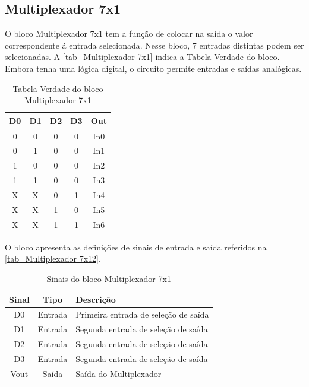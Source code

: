 \renewcommand{\NomeBloco}{Multiplexador 7x1}
\renewcommand{\NomePTab}{tab_\NomeBloco}
\renewcommand{\NomeSTab}{tab_\NomeBloco2}
\renewcommand{\NomePFig}{fig_\NomeBloco}
\renewcommand{\NomeSFig}{fig_\NomeBloco2}
\renewcommand{\NomeTTab}{tab_\NomeBloco3}

\subsection{\NomeBloco}

O bloco \NomeBloco{} tem a fun{\c c}\~ao de colocar na sa\'ida o valor correspondente \'a entrada selecionada. Nesse bloco, 7 entradas distintas podem ser selecionadas. A \autoref{\NomePTab} indica a Tabela Verdade do bloco. Embora tenha uma l\'ogica digital, o circuito permite entradas e sa\'idas anal\'ogicas.

\begin{table}[htbp]

\caption{Tabela Verdade do bloco \NomeBloco}%
\label{\NomePTab}
\centering
\begin{tabular}{ccccc}
    \toprule
    D0 & D1 & D2 & D3 & Out \\
    \midrule \midrule
    0 & 0 & 0 & 0 & In0 \\
    \midrule
    0 & 1 & 0 & 0 & In1 \\
    \midrule
    1 & 0 & 0 & 0 & In2 \\
    \midrule
    1 & 1 & 0 & 0 & In3 \\
    \midrule
    X & X & 0 & 1 & In4 \\
    \midrule
    X & X & 1 & 0 & In5 \\
    \midrule
    X & X & 1 & 1 & In6 \\
\bottomrule

\end{tabular}
\end{table}

O bloco apresenta as defini{\c c}\~oes de sinais de entrada e sa\'ida referidos na \autoref{\NomeSTab}.

\begin{table}[htbp]
\caption{Sinais do bloco \NomeBloco}
\label{\NomeSTab}
\centering
\begin{tabular}{ccl}

    \toprule
    Sinal & Tipo    & Descri{\c c}\~ao        \\
    \midrule \midrule
    D0    & Entrada & Primeira entrada de sele{\c c}\~ao de sa\'ida \\
    \midrule
    D1    & Entrada & Segunda entrada de sele{\c c}\~ao de sa\'ida \\
    \midrule
    D2    & Entrada & Segunda entrada de sele{\c c}\~ao de sa\'ida \\
    \midrule
    D3    & Entrada & Segunda entrada de sele{\c c}\~ao de sa\'ida \\
    \midrule
    Vout & Sa\'ida & Sa\'ida do Multiplexador\\
    \midrule
    \bottomrule
\end{tabular}
\end{table}

